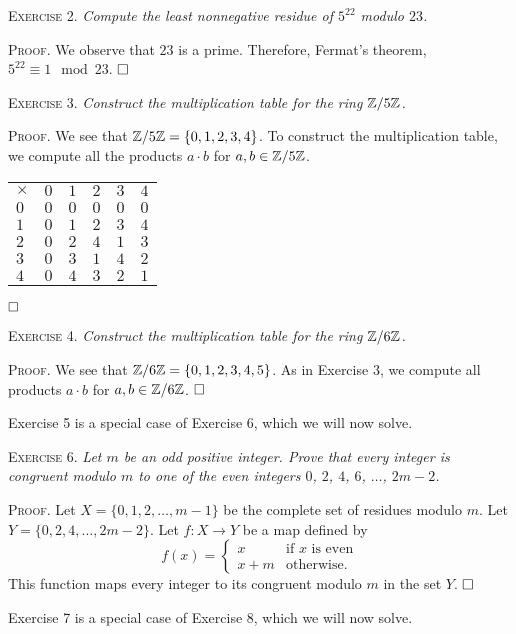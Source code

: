 \documentclass[11pt, leqno]{article}
\newcommand{\done}{\ensuremath{\hfill\square}}
\begin{document}
\textsc{Exercise 2}. \emph{Compute the least nonnegative residue of $5^{22}$ modulo $23$.}

\textsc{Proof}. We observe that $23$ is a prime. Therefore, Fermat's theorem, $5^{22} \equiv 1 \mod 23$. \done

\textsc{Exercise 3}. \emph{Construct the multiplication table for the ring $\mathbb{Z}/5\mathbb{Z}$.}

\textsc{Proof}. We see that $\mathbb{Z}/5\mathbb{Z} = \{ 0, 1, 2, 3, 4\}$. To construct the multiplication table, we compute all the products $a\cdot b$ for $a, b \in \mathbb{Z}/5\mathbb{Z}$.
\begin{longtable}{p{2em} p{2em} p{2em} p{2em} p{2em} p{2em}}
  $\times$ & $0$ & $1$ & $2$ & $3$ & $4$ \\
  $0$      & $0$ & $0$ & $0$ & $0$ & $0$ \\
  $1$      & $0$ & $1$ & $2$ & $3$ & $4$ \\
  $2$      & $0$ & $2$ & $4$ & $1$ & $3$ \\
  $3$      & $0$ & $3$ & $1$ & $4$ & $2$ \\
  $4$      & $0$ & $4$ & $3$ & $2$ & $1$
\end{longtable}
\reduce
\done

\textsc{Exercise 4}. \emph{Construct the multiplication table for the ring $\mathbb{Z}/6\mathbb{Z}$.}

\textsc{Proof}. We see that $\mathbb{Z}/6\mathbb{Z} = \{ 0, 1, 2, 3, 4, 5 \}$. As in Exercise $3$, we compute all products $a \cdot b$ for $a, b \in \mathbb{Z}/6\mathbb{Z}$. \done

Exercise 5 is a special case of Exercise 6, which we will now solve.

\textsc{Exercise 6}. \emph{Let $m$ be an odd positive integer. Prove that every integer is congruent modulo $m$ to one of the even integers $0$, $2$, $4$, $6$, $\ldots$, $2m-2$.}

\textsc{Proof}. Let $X=\{0,1,2,\ldots,m-1\}$ be the complete set of residues modulo $m$. Let $Y=\{0,2,4,\ldots,2m-2\}$. Let $f: X \to Y$ be a map defined by 
\begin{displaymath}
  f(x) = \begin{cases}
    x & \text{if } x \text{ is even} \\
    x+m & \text{otherwise.}
  \end{cases}
\end{displaymath}
This function maps every integer to its congruent modulo $m$ in the set $Y$. \done

Exercise 7 is a special case of Exercise 8, which we will now solve.
\end{document}
